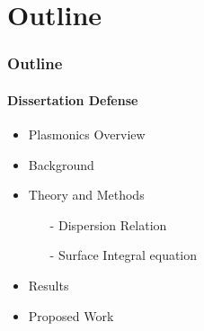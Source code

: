 \documentclass[mathserif,18pt,xcolor=table]{beamer}
\begin{document}
\section{Outline}
\begin{frame}
  \frametitle{Outline}
  \framesubtitle{Dissertation Defense}
  \begin{itemize}
    \item Plasmonics Overview
    \item Background
    \item Theory and Methods
    \begin{itemize}
      \item[-]{Dispersion Relation}
      \item[-]{Surface Integral equation}
    \end{itemize}
    \item Results
    \item Proposed Work
  \end{itemize}
\end{frame}
\end{document}

